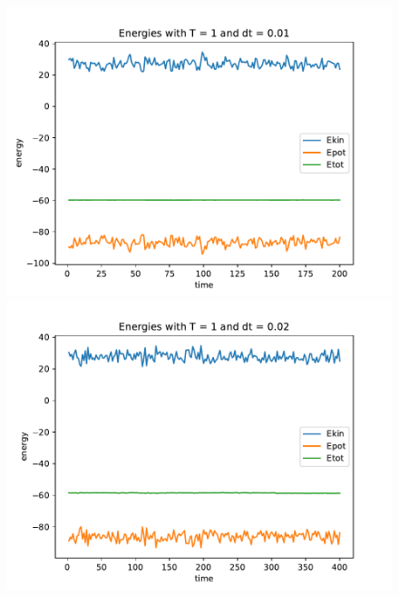 \documentclass[a4paper,12pt]{article}
\begin{document}
\begin{figure}[!ht]
  \centering
  \begin{minipage}{0.49\textwidth}
    \includegraphics[width=\textwidth]{img/3_2a_dt001.pdf}
  \end{minipage}
  \begin{minipage}{0.49\textwidth}
    \includegraphics[width=\textwidth]{img/3_2a_dt002.pdf}
  \end{minipage}
\end{figure}
\end{document}
